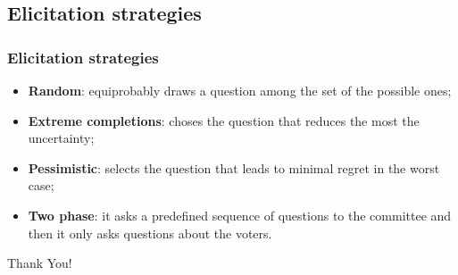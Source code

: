 \documentclass{beamer}
\begin{document}
	\subsection{Elicitation strategies}
	\begin{frame}
		\frametitle{Elicitation strategies}
		\begin{itemize}
			\item \textbf{Random}: equiprobably draws a question among the set of the possible ones;
			
			\item \textbf{Extreme completions}: choses the question that reduces the most the uncertainty;
			
			\item \textbf{Pessimistic}: selects the question that leads to minimal regret in the worst case; 
			
			\item \textbf{Two phase}: it asks a predefined sequence of questions to the committee and then it only asks questions about the voters.
		\end{itemize}
		\bigskip
	\end{frame}


\addtocounter{framenumber}{-1}
\begin{frame}[plain]
	\centering \color{darkred}\LARGE Thank You!
\end{frame}





 


\end{document}
